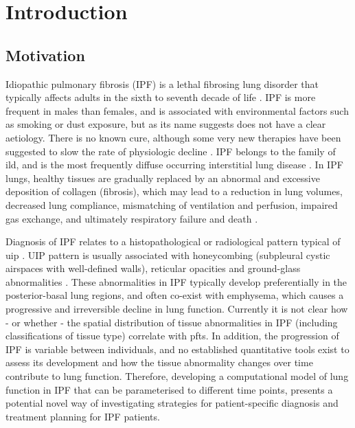 \chapter{Introduction} \label{Yuwen_Introduction}
\section{Motivation}
Idiopathic pulmonary fibrosis (IPF) is a lethal fibrosing lung disorder that typically affects adults in the sixth to seventh decade of life \citep{meltzer2008idiopathic,king2011idiopathic}. IPF is more frequent in males than females, and is associated with environmental factors such as smoking or dust exposure, but as its name suggests does not have a clear aetiology. There is no known cure, although some very new therapies have been suggested to slow the rate of physiologic decline \citep{raghu2011official}. IPF belongs to the family of \gls{ild}, and is the most frequently diffuse occurring interstitial lung disease \citep{meltzer2008idiopathic}. In IPF lungs, healthy tissues are gradually replaced by an abnormal and excessive deposition of collagen (fibrosis), which may lead to a reduction in lung volumes, decreased lung compliance, mismatching of ventilation and perfusion, impaired gas exchange, and ultimately respiratory failure and death \citep{richeldi2017idiopathic}.

Diagnosis of IPF relates to a histopathological or radiological pattern typical of \gls{uip} \citep{raghu2011official,xaubet2017idiopathic}. UIP pattern is usually associated with honeycombing (subpleural cystic airspaces with well-defined walls),  reticular opacities and ground-glass abnormalities \citep{raghu2011official,richeldi2017idiopathic}. These abnormalities in IPF typically develop preferentially in the posterior-basal lung regions, and often co-exist with emphysema, which causes a progressive and irreversible decline in lung function. Currently it is not clear how - or whether - the spatial distribution of tissue abnormalities in IPF (including classifications of tissue type) correlate with \gls{pfts}. In addition, the progression of IPF is variable between individuals, and no established quantitative tools exist to assess its development and how the tissue abnormality changes over time contribute to lung function. Therefore, developing a computational model of lung function in IPF that can be parameterised to different time points, presents a potential novel way of investigating strategies for patient-specific diagnosis and treatment planning for IPF patients.

